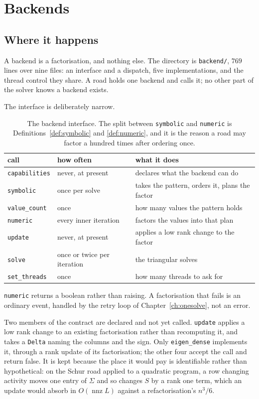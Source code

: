 \documentclass[a4paper,11pt]{book}
\theoremstyle{plain}
\theoremstyle{definition}
\theoremstyle{remark}
\numberwithin{equation}{chapter}
\numberwithin{algorithm}{chapter}
\begin{document}
	\chapter{Backends}

	\section{Where it happens}

	A backend is a factorisation, and nothing else. The directory is
	\texttt{backend/}, $769$ lines over nine files: an interface and a dispatch,
	five implementations, and the thread control they share. A road holds one
	backend and calls it; no other part of the solver knows a backend exists.

	The interface is deliberately narrow.

	\begin{table}[H]
		\centering\small
		\begin{tabular}{lll}
			\toprule
			call & how often & what it does\\
			\midrule
			\texttt{capabilities} & never, at present & declares what the backend
			can do\\
			\texttt{symbolic} & once per solve & takes the pattern, orders it,
			plans the factor\\
			\texttt{value\_count} & once & how many values the pattern holds\\
			\texttt{numeric} & every inner iteration & factors the values into
			that plan\\
			\texttt{update} & never, at present & applies a low rank change to the
			factor\\
			\texttt{solve} & once or twice per iteration & the triangular solves\\
			\texttt{set\_threads} & once & how many threads to ask for\\
			\bottomrule
		\end{tabular}
		\caption{The backend interface. The split between \texttt{symbolic} and
			\texttt{numeric} is Definitions~\ref{def:symbolic} and
			\ref{def:numeric}, and it is the reason a road may factor a hundred times
			after ordering once.}
	\end{table}

	\texttt{numeric} returns a boolean rather than raising. A factorisation that
	fails is an ordinary event, handled by the retry loop of
	Chapter~\ref{ch:onesolve}, not an error.

	Two members of the contract are declared and not yet called.
	\texttt{update} applies a low rank change to an existing factorisation rather
	than recomputing it, and takes a \texttt{Delta} naming the columns and the
	sign. Only \texttt{eigen\_dense} implements it, through a rank update of its
	factorisation; the other four accept the call and return false. It is kept
	because the place it would pay is identifiable rather than hypothetical: on
	the Schur road applied to a quadratic program, a row changing activity moves
	one entry of $\Sigma$ and so changes $S$ by a rank one term, which an update
	would absorb in $O(\operatorname{nnz}L)$ against a refactorisation's $n^3/6$.
\end{document}

